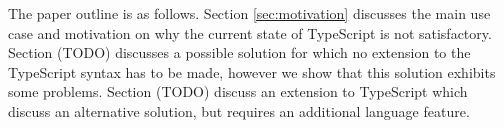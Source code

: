 The paper outline is as follows. Section \ref{sec:motivation} discusses the main use case and motivation on why the current state of TypeScript is not satisfactory. Section (TODO) discusses a possible solution for which no extension to the TypeScript syntax has to be made, however we show that this solution exhibits some problems. Section (TODO) discuss an extension to TypeScript which discuss an alternative solution, but requires an additional language feature.

